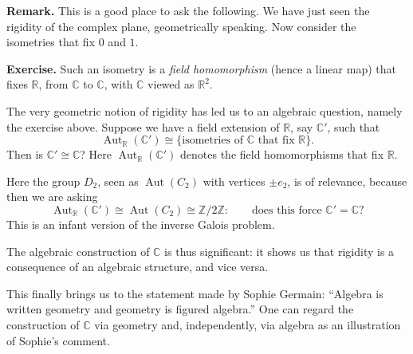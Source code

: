 \documentclass[11pt,a4paper]{article}
\begin{document}
\textbf{Remark.}
This is a good place to ask the following. We have just seen the rigidity of the complex plane, geometrically speaking. Now consider the isometries that fix $0$ and $1$.

\textbf{Exercise.}
Such an isometry is a \emph{field homomorphism} (hence a linear map) that fixes $\mathbb R$, from $\mathbb C$ to $\mathbb C$, with $\mathbb C$ viewed as $\mathbb R^2$.

The very geometric notion of rigidity has led us to an algebraic question, namely the exercise above. Suppose we have a field extension of $\mathbb R$, say $\mathbb C'$, such that
\[
\operatorname{Aut}_{\mathbb R}(\mathbb C')
\cong
\{\text{isometries of $\mathbb C$ that fix $\mathbb R$}\}.
\]
Then is $\mathbb C'\cong\mathbb C$? Here $\operatorname{Aut}_{\mathbb R}(\mathbb C')$ denotes the field homomorphisms that fix $\mathbb R$.

Here the group $D_2$, seen as $\operatorname{Aut}(C_2)$ with vertices $\pm e_2$, is of relevance, because then we are asking
\[
\operatorname{Aut}_{\mathbb R}(\mathbb C')
\cong\operatorname{Aut}(C_2)
\cong\mathbb Z/2\mathbb Z:
\qquad\text{does this force $\mathbb C'=\mathbb C$?}
\]
This is an infant version of the inverse Galois problem.

The algebraic construction of $\mathbb C$ is thus significant: it shows us that rigidity is a consequence of an algebraic structure, and vice versa.

This finally brings us to the statement made by Sophie Germain: ``Algebra is written geometry and geometry is figured algebra.'' One can regard the construction of $\mathbb C$ via geometry and, independently, via algebra as an illustration of Sophie's comment.
\end{document}
